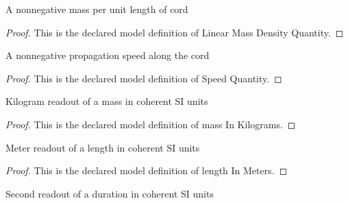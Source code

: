 \begin{definition}
  \label{def:physics:phyx-mini-0243:phyxminiproblems-problemphyxmini0243-linearmassdensityquantity}
  A nonnegative mass per unit length of cord
\end{definition}
\begin{proof}
  This is the declared model definition of Linear Mass Density Quantity.
\end{proof}
\begin{definition}
  \label{def:physics:phyx-mini-0243:phyxminiproblems-problemphyxmini0243-speedquantity}
  A nonnegative propagation speed along the cord
\end{definition}
\begin{proof}
  This is the declared model definition of Speed Quantity.
\end{proof}
\begin{definition}
  \label{def:physics:phyx-mini-0243:phyxminiproblems-problemphyxmini0243-massinkilograms}
  Kilogram readout of a mass in coherent SI units
\end{definition}
\begin{proof}
  This is the declared model definition of mass In Kilograms.
\end{proof}
\begin{definition}
  \label{def:physics:phyx-mini-0243:phyxminiproblems-problemphyxmini0243-lengthinmeters}
  Meter readout of a length in coherent SI units
\end{definition}
\begin{proof}
  This is the declared model definition of length In Meters.
\end{proof}
\begin{definition}
  \label{def:physics:phyx-mini-0243:phyxminiproblems-problemphyxmini0243-timeinseconds}
  Second readout of a duration in coherent SI units
\end{definition}
